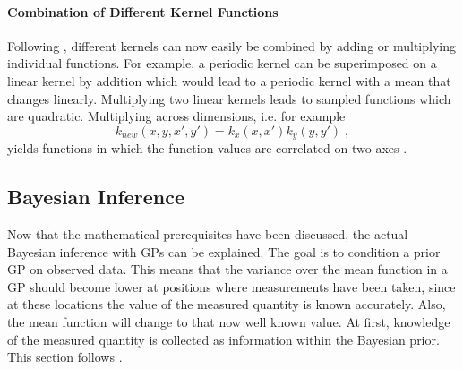 \documentclass[%
  a4paper,oneside,%
  11pt,%
  smallchapters,
  style=printdev,
  extramargin,
  green,%
  rgb, <cmyk>
  ]{tubsbook}
\begin{document}
\paragraph{Combination of Different Kernel Functions}
Following \cite{Duvenaud, gortler2019}, different kernels can now easily be combined by adding or multiplying individual functions. For example, a periodic kernel can be superimposed on a linear kernel by addition which would lead to a periodic kernel with a mean that changes linearly. Multiplying two linear kernels leads to sampled functions which are quadratic. Multiplying across dimensions, i.e. for example
\begin{equation}
k_{new}(x,y,x',y') = k_x(x,x')k_y(y,y') \;,
\end{equation}
yields functions in which the function values are correlated on two axes \cite{Duvenaud}. 

\subsection{Bayesian Inference}
Now that the mathematical prerequisites have been discussed, the actual Bayesian inference with GPs can be explained. The goal is to condition a prior GP on observed data. This means that the variance over the mean function in a GP should become lower at positions where measurements have been taken, since at these locations the value of the measured quantity is known accurately. Also, the mean function will change to that now well known value. At first, knowledge of the measured quantity is collected as information within the Bayesian prior. This section follows \cite{gortler2019, rasmussen2006}.
\end{document}
